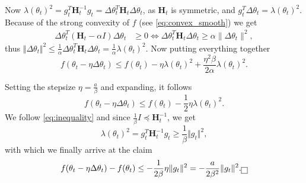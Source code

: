 Now $\lambda (\theta_t)^2 = g_t^T \mathbf{H}_t^{-1} g_t  = \Delta \theta_t^T \mathbf{H}_t \Delta \theta_t$, as $\mathbf{H}_t$ is symmetric, and $g_t^T \Delta \theta_t =\lambda(\theta_t)^2 $. \\
Because of the strong convexity of $f$ (see \ref{eq:convex_smooth}) we get
\begin{align}
    \label{eq:inequality}
    \Delta \theta_t^T (\mathbf{H}_t - \alpha I) \Delta \theta_t &\geq 0 
    \Longleftrightarrow \Delta \theta_t^T \mathbf{H}_t \Delta \theta_t   \geq \alpha \|\Delta \theta_t\|^2,
\end{align}
thus $  \Vert \Delta \theta_t \Vert ^2 \leq  \frac{1}{\alpha} \Delta \theta_t^T \mathbf{H}_t \Delta \theta_t = \frac{1}{\alpha} \lambda (\theta_t)^2 $.
Now putting everything together
\begin{equation}
    f(\theta_t - \eta\Delta \theta_t) \leq f(\theta_t) - \eta \lambda (\theta_t)^2 + \frac{\eta^2\beta}{2\alpha} \lambda (\theta_t)^2.
\end{equation}

Setting the stepsize $\eta = \frac{a}{\beta}$ and expanding, it follows
\begin{equation}
    f(\theta_t - \eta\Delta \theta_t) \leq f(\theta_t) - \frac{1}{2} \eta \lambda (\theta_t)^2 .
\end{equation}
We follow \ref{eq:inequality} and since $\frac{1}{\beta}I \preceq \mathbf{H}_t^{-1}  $, we get
\begin{equation}
    \lambda (\theta_t)^2 = g_t^T \mathbf{H}_t^{-1} g_t \geq \frac{1}{\beta} \Vert g_t \Vert ^2,
\end{equation}
with which we finally arrive at the claim
\begin{equation}
    f(\theta_t - \eta\Delta \theta_t) - f(\theta_t) \leq -\frac{1}{2 \beta} \eta \Vert g_t\Vert^2 =  -\frac{a}{2 \beta^{2}}  \Vert g_t\Vert^2.
     \hfill \fbox{\phantom{\rule{.2ex}{.2ex}}}
\end{equation}

